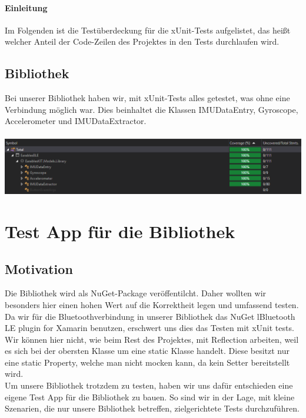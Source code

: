 \documentclass[a4paper,12pt]{article}
\begin{document}
\paragraph{Einleitung}
Im Folgenden ist die Testüberdeckung für die xUnit-Tests aufgelistet, das heißt welcher Anteil der Code-Zeilen des Projektes in den Tests durchlaufen wird.

\subsection{Bibliothek}
Bei unserer Bibliothek haben wir, mit xUnit-Tests alles getestet, was ohne eine Verbindung  möglich war. Dies beinhaltet die Klassen IMUDataEntry, Gyroscope, Accelerometer und IMUDataExtractor.
\\ \\ 
\includegraphics[width=1\textwidth]{./bilder/BibTestCoverage/Testcoverage.PNG}



\section{Test App für die Bibliothek}
\subsection{Motivation}
Die Bibliothek wird als NuGet-Package veröffentilcht. Daher wollten wir besonders hier einen hohen Wert auf die Korrektheit legen und umfassend testen.\\
Da wir für die Bluetoothverbindung in unserer Bibliothek das NuGet \glqq{}lBluetooth LE plugin for Xamarin\grqq{} benutzen, erschwert uns dies das Testen mit xUnit tests. Wir können hier nicht, wie beim Rest des Projektes, mit Reflection arbeiten, weil es sich bei der \glqq{}obersten Klasse\grqq{} um eine static Klasse handelt. Diese besitzt nur eine static Property, welche man nicht mocken kann, da kein Setter bereitstellt wird.\\
 Um unsere Bibliothek trotzdem zu testen, haben wir uns dafür entschieden eine eigene Test App für die Bibliothek zu bauen. So sind wir in der Lage, mit kleine Szenarien, die nur unsere Bibliothek betreffen, zielgerichtete Tests durchzuführen.
\end{document}
